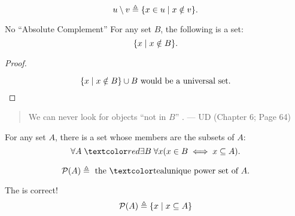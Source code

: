 \begin{frame}{}
  \begin{definition}
    \[
      u \setminus v \triangleq \{x \in u \mid x \notin v\}.
    \]
  \end{definition}

  \pause
  \begin{theorem}{No ``Absolute Complement''}
    For any set $B$, the following is  a set:
    \[
      \{x \mid x \notin B\}.
    \]
  \end{theorem}

  \pause
  \begin{proof}
    \begin{center}
    \end{center}

    \pause
    \vspace{-0.50cm}
    \[
      \{x \mid x \notin B\} \cup B \text{ would be a universal set}.
    \]
  \end{proof}

  \pause
  \begin{quote}
    We can never look for objects ``not in $B$'' .
    \hfill --- UD (Chapter 6; Page 64)
  \end{quote}
\end{frame}

\begin{frame}{}
  \begin{axiom}
    For any set $A$, there is a set whose members are the subsets of $A$:
    \[
      \forall A\; \red{\exists B}\; \forall x (x \in B \iff x \subseteq A).
    \]
  \end{axiom}

  \begin{definition}[``$\mathcal{P}(A)$'']
    \[
      \mathcal{P}(A) \triangleq \text{ the \teal{unique} power set of } A.
    \]
  \end{definition}

  \begin{alertblock}{The is  correct!}
    \[
      \mathcal{P}(A) \triangleq \{x \mid x \subseteq A\}
    \]
  \end{alertblock}
\end{frame}
